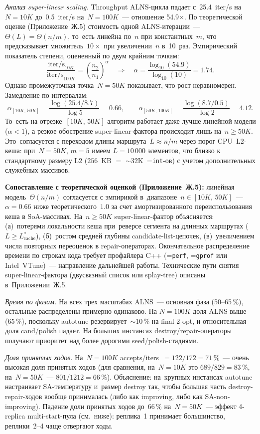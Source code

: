 \documentclass[a4paper,14pt]{extreport}
\makeatletter
\let\old@texttt\texttt
\renewcommand{\texttt}[1]{{\sloppy\hyphenchar\font=\m@ne\old@texttt{#1}}}
\makeatother
\begin{document}
\textit{Анализ super-linear scaling.} Throughput ALNS-цикла падает с~25.4~iter/s на~$N=10K$ до~0.5~iter/s на~$N=100K$~--- отношение 54.9$\times$. По теоретической оценке (Приложение~Ж.5) стоимость одной ALNS-итерации~--- $\Theta(L) = \Theta(n/m)$, то~есть линейна по~$n$ при константных~$m$, что предсказывает множитель~$10\times$ при увеличении~$n$ в~10~раз. Эмпирический показатель степени, оцененный по двум крайним точкам:
\[
\frac{\mathrm{iter/s}_{10K}}{\mathrm{iter/s}_{100K}} = \left(\frac{n_2}{n_1}\right)^{\alpha}
\quad\Rightarrow\quad
\alpha = \frac{\log_{10}(54.9)}{\log_{10}(10)} = 1.74.
\]
Однако промежуточная точка~$N=50K$ показывает, что рост неравномерен. Замедление по интервалам:
\[
\alpha_{[10K,\,50K]} = \frac{\log(25.4 / 8.7)}{\log 5} = 0.66, \qquad
\alpha_{[50K,\,100K]} = \frac{\log(8.7 / 0.5)}{\log 2} = 4.12.
\]
То~есть на отрезке~$[10K,\,50K]$ алгоритм работает даже лучше линейной модели ($\alpha < 1$), а резкое обострение super-linear-фактора происходит лишь на~$n \geq 50K$. Это~согласуется с переходом длины маршрута~$L \approx n/m$ через порог CPU~L2-кеша: при~$N=50K$, $m=5$ имеем $L = 10\,000$ элементов, что близко к стандартному размеру L2 ($256$~KB ${=}$ $\sim$32K~\texttt{int}-ов) с учетом дополнительных служебных массивов.

\textbf{Сопоставление с теоретической оценкой (Приложение~Ж.5):} линейная модель~$\Theta(n/m)$ согласуется с эмпирикой в~диапазоне~$n \in [10K,\,50K]$~--- $\alpha = 0.66$ ниже теоретического~$1.0$ за счет амортизированного переиспользования кеша в SoA-массивах. На~$n \geq 50K$ super-linear-фактор объясняется: (а)~потерями локальности кеша при~реверсе сегмента на длинных маршрутах ($L \geq L^*_{\mathrm{cache}}$), (б)~ростом средней глубины candidate-list-цепочек, (в)~увеличением числа повторных переоценок в repair-операторах. Окончательное распределение времени по строкам кода требует профайлера C++ (\texttt{perf}, \texttt{gprof} или Intel~VTune)~--- направление дальнейшей работы. Технические пути снятия super-linear-фактора (двусвязный список или splay-tree) описаны в~Приложении~Ж.5.

\textit{Время по фазам.} На всех трех масштабах ALNS~--- основная фаза (50--65\,\%), остальные распределены примерно одинаково. На $N = 100K$ доля ALNS выше (65\,\%), поскольку autotune резервирует~$\sim 10\,\%$ на final-2-opt, и относительная доля cand/polish падает. На больших инстансах destroy/repair-операторы получают приоритет над более дорогими seed/polish-стадиями.

\textit{Доля принятых ходов.} На~$N=100K$ accepts/iters~$=122/172=71\,\%$~--- очень высокая доля принятых ходов (для сравнения, на~$N=10K$ это $689/829=83\,\%$, на~$N=50K$~--- $801/1212=66\,\%$). Объяснение: на~крупных инстансах autotune настраивает SA-температуру и~размер destroy так, чтобы большая часть destroy-repair-ходов вообще принималась (либо как improving, либо как SA-non-improving). Падение доли принятых ходов до~66\,\% на~$N=50K$~--- эффект 4-replica multi-start-пула (см.~ниже): реплика~1 принимает большинство, реплики~2--4 чаще отвергают ходы.
\end{document}
